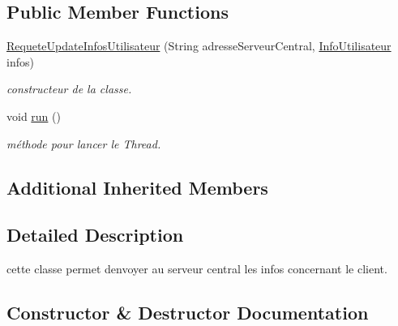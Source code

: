 \subsection*{Public Member Functions}
\begin{DoxyCompactItemize}
\item 
\hyperlink{classrequete_1_1RequeteUpdateInfosUtilisateur_af4ad8be6ca59ea30a643d98b44fd6b82}{Requete\+Update\+Infos\+Utilisateur} (String adresse\+Serveur\+Central, \hyperlink{classcommun_1_1InfoUtilisateur}{Info\+Utilisateur} infos)
\begin{DoxyCompactList}\small\item\em constructeur de la classe. \end{DoxyCompactList}\item 
\mbox{\label{classrequete_1_1RequeteUpdateInfosUtilisateur_af28513ad85d93be736ca76bf950fa55b}} 
void \hyperlink{classrequete_1_1RequeteUpdateInfosUtilisateur_af28513ad85d93be736ca76bf950fa55b}{run} ()
\begin{DoxyCompactList}\small\item\em méthode pour lancer le Thread. \end{DoxyCompactList}\end{DoxyCompactItemize}
\subsection*{Additional Inherited Members}


\subsection{Detailed Description}
cette classe permet d\textquotesingle{}envoyer au serveur central les infos concernant le client. 

\subsection{Constructor \& Destructor Documentation}
\mbox{\label{classrequete_1_1RequeteUpdateInfosUtilisateur_af4ad8be6ca59ea30a643d98b44fd6b82}} 
